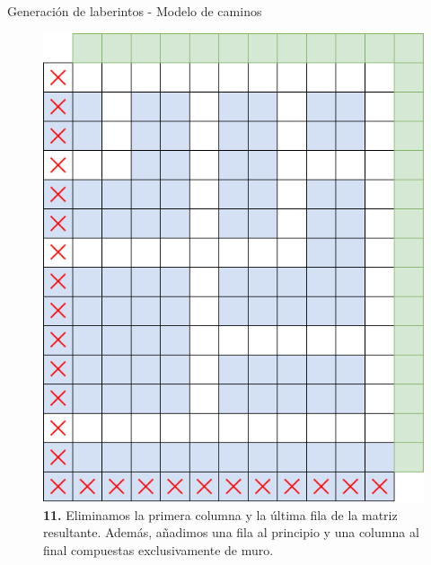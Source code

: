 \documentclass{beamer}
\begin{document}
    \begin{frame}{Generación de laberintos - Modelo de caminos \scriptsize{\hfill \secname}}
        \begin{figure}[H]
        \centering
            \includegraphics[scale=0.275]{img/paso11.png}
            \caption{\textbf{11.} Eliminamos la primera columna y la última fila de la matriz resultante. Además, añadimos una fila al principio y una columna al final compuestas exclusivamente de muro.}
        \end{figure}
    \end{frame}
    
\end{document}
